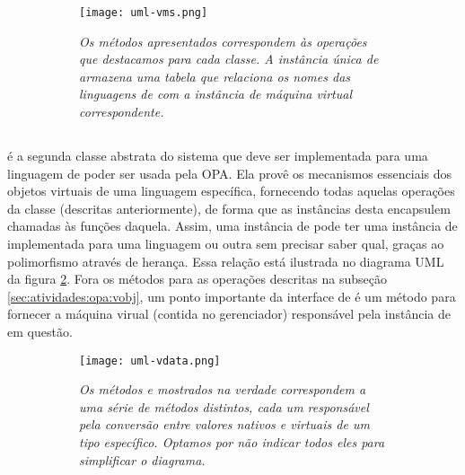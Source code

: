   \begin{figure}[ht]
    \centering
    \caption{}
    \begin{subfigure}{.8\textwidth}
      \begin{center}
        \texttt{[image: uml-vms.png]}
        \vspace{1em}

        \textit{
          Os métodos apresentados correspondem às operações que destacamos para
          cada classe. A instância única de \SMgr{} armazena uma tabela que
          relaciona os nomes das linguagens de \script{} com a instância de
          máquina virtual correspondente.
        }
      \end{center}
    \end{subfigure}
    \label{fig:uml-vms}
  \end{figure}
  
  \subsection{\VData{}}
  \label{sec:atividades:opa:vdata}
  \VData{} é a segunda classe abstrata do sistema que deve ser implementada para uma linguagem
  de \script{} poder ser usada pela OPA. Ela provê os mecanismos essenciais dos objetos virtuais
  de uma linguagem específica, fornecendo todas aquelas
  operações da classe \VObj{} (descritas anteriormente), de forma que as instâncias desta
  encapsulem chamadas às funções daquela. Assim, uma instância
  de \VObj{} pode ter uma instância de \VData{} implementada para uma linguagem 
  ou outra sem precisar saber qual, graças ao polimorfismo através de herança. Essa relação
  está ilustrada no diagrama UML da figura \ref{fig:uml-vdata}. Fora os métodos para as
  operações descritas na subseção \ref{sec:atividades:opa:vobj}, um ponto importante da
  interface de \VData{} é um método para fornecer a máquina virual (contida no gerenciador)
  responsável pela instância de \VData{} em questão.

  \begin{figure}[ht]
    \centering
    \caption{}
    \begin{subfigure}{.8\textwidth}
      \begin{center}
        \texttt{[image: uml-vdata.png]}
        \vspace{1em}

        \textit{
          Os métodos  e  mostrados na verdade correspondem
          a uma série de métodos distintos, cada um responsável pela conversão entre
          valores nativos e virtuais de um tipo específico. Optamos por não indicar
          todos eles para simplificar o diagrama.
        }
      \end{center}
    \end{subfigure}
    \label{fig:uml-vdata}
  \end{figure}
  
